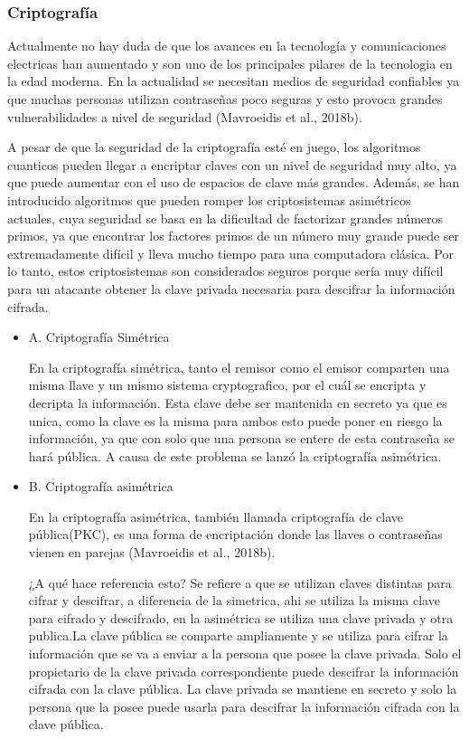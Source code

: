 \documentclass{article}
\begin{document}
\subsubsection{Criptografía}
Actualmente no hay duda de que los avances en la tecnología y comunicaciones electricas han aumentado y son uno de los principales pilares de la tecnologia en la edad moderna. En la actualidad se necesitan medios de seguridad confiables ya que muchas personas utilizan contraseñas poco seguras y esto provoca grandes vulnerabilidades a nivel de seguridad (Mavroeidis et al., 2018b).

A pesar de que la seguridad de la criptografía esté en juego, los algoritmos cuanticos pueden llegar a encriptar claves con un nivel de seguridad muy alto, ya que puede aumentar con el uso de espacios de clave más grandes. Además, se han introducido algoritmos que pueden romper los criptosistemas asimétricos actuales, cuya seguridad se basa en la dificultad de factorizar grandes números primos, ya que encontrar los factores primos de un número muy grande puede ser extremadamente difícil y lleva mucho tiempo para una computadora clásica. Por lo tanto, estos criptosistemas son considerados seguros porque sería muy difícil para un atacante obtener la clave privada necesaria para descifrar la información cifrada.

\begin{itemize}
    \item{A}. Criptografía Simétrica

        En la criptografía simétrica, tanto el remisor como el emisor comparten una misma llave y un mismo sistema cryptografico, por el cuál se encripta y decripta la información. Esta clave debe ser mantenida en secreto ya que es unica, como la clave es la misma para ambos esto puede poner en riesgo la información, ya que con solo que una persona se entere de esta contraseña se hará pública. A causa de este problema se lanzó la criptografía asimétrica.
    \item{B}. Criptografía asimétrica

        En la criptografía asimétrica, también llamada criptografía de clave pública(PKC), es una forma de encriptación donde las llaves o contraseñas vienen en parejas (Mavroeidis et al., 2018b).

        ¿A qué hace referencia esto? Se refiere a que se utilizan claves distintas para cifrar y descifrar, a diferencia de la simetrica, ahi se utiliza la misma clave para cifrado y descifrado, en la asimétrica se utiliza una clave privada y otra publica.La clave pública se comparte ampliamente y se utiliza para cifrar la información que se va a enviar a la persona que posee la clave privada. Solo el propietario de la clave privada correspondiente puede descifrar la información cifrada con la clave pública. La clave privada se mantiene en secreto y solo la persona que la posee puede usarla para descifrar la información cifrada con la clave pública.

\end{itemize}
\end{document}
